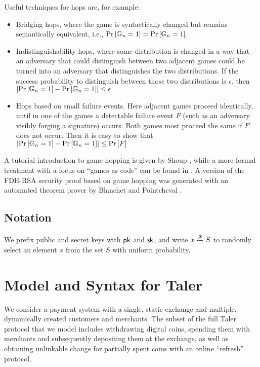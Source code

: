 Useful techniques for hops are, for example:
\begin{itemize}
  \item Bridging hops, where the game is syntactically changed but remains
    semantically equivalent, i.e., $\Pr\left [\mathbb{G}_n = 1 \right ] = \Pr\left [\mathbb{G}_n = 1 \right ]$.
  \item Indistinguishability hops, where some distribution is changed in a way that
    an adversary that could distinguish between two adjacent games could be turned
    into an adversary that distinguishes the two distributions.  If the success probability
    to distinguish between those two distributions is $\epsilon$, then
    $\left|\Pr\left [\mathbb{G}_n = 1 \right ] - \Pr\left [\mathbb{G}_n = 1 \right ]\right| \le \epsilon$
  \item Hops based on small failure events.  Here adjacent games proceed
    identically, until in one of the games a detectable failure event $F$ (such
    as an adversary visibly forging a signature) occurs.  Both games most proceed
    the same if $F$ does not occur.  Then it is easy to show \cite{shoup2004sequences}
    that $\left|\Pr\left [\mathbb{G}_n = 1 \right ] - \Pr\left [\mathbb{G}_n = 1 \right ]\right| \le \Pr\left [F \right ]$
\end{itemize}

A tutorial introduction to game hopping is given by Shoup \cite{shoup2004sequences}, while a more formal
treatment with a focus on ``games as code'' can be found in \cite{bellare2006code}.  A
version of the FDH-RSA security proof based on game hopping was generated with an
automated theorem prover by Blanchet and Pointcheval \cite{blanchet2006automated}.



\subsection{Notation}
We prefix public and secret keys with $\mathsf{pk}$ and $\mathsf{sk}$, and write $x
\xleftarrow{\text{\$}} S$ to randomly select an element $x$ from the set $S$ with uniform
probability.

\section{Model and Syntax for Taler}

We consider a payment system with a single, static exchange and multiple,
dynamically created customers and merchants.  The subset of the full Taler
protocol that we model includes withdrawing digital coins, spending them with
merchants and subsequently depositing them at the exchange, as well as
obtaining unlinkable change for partially spent coins with an online
``refresh'' protocol.

